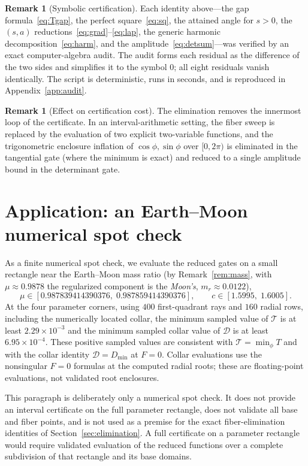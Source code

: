 \documentclass[11pt,reqno]{amsart}
\theoremstyle{plain}
\theoremstyle{definition}
\newtheorem{remark}[theorem]{Remark}
\newcommand{\calT}{\mathcal{T}}
\newcommand{\calD}{\mathcal{D}}
\begin{document}
\begin{remark}[Symbolic certification]\label{rem:audit}
Each identity above---the gap formula~\eqref{eq:Tgap}, the perfect square~\eqref{eq:sq}, the attained angle for $s>0$, the $(s,a)$ reductions~\eqref{eq:grad}--\eqref{eq:lap}, the generic harmonic decomposition~\eqref{eq:harm}, and the amplitude~\eqref{eq:detsum}---was verified by an exact computer-algebra audit. The audit forms each residual as the difference of the two sides and simplifies it to the symbol $0$; all eight residuals vanish identically. The script is deterministic, runs in seconds, and is reproduced in Appendix~\ref{app:audit}.
\end{remark}

\begin{remark}[Effect on certification cost]
The elimination removes the innermost loop of the certificate. In an interval-arithmetic setting, the fiber sweep is replaced by the evaluation of two explicit two-variable functions, and the trigonometric enclosure inflation of $\cos\phi,\sin\phi$ over $[0,2\pi)$ is eliminated in the tangential gate (where the minimum is exact) and reduced to a single amplitude bound in the determinant gate.
\end{remark}

\section{Application: an Earth--Moon numerical spot check}\label{sec:earthmoon}

As a finite numerical spot check, we evaluate the reduced gates on a small rectangle near the Earth--Moon mass ratio (by Remark~\ref{rem:mass}, with $\mu\approx0.9878$ the regularized component is the \emph{Moon's}, $m_r\approx 0.0122$),
\[
\mu\in[0.987839414390376,\;0.987859414390376],\qquad c\in[1.5995,\;1.6005].
\]
At the four parameter corners, using $400$ first-quadrant rays and $160$ radial rows, including the numerically located collar, the minimum sampled value of $\calT$ is at least $2.29\times10^{-3}$ and the minimum sampled collar value of $\calD$ is at least $6.95\times10^{-4}$. These positive sampled values are consistent with $\calT=\min_\phi T$ and with the collar identity $\calD=D_{\min}$ at $F=0$. Collar evaluations use the nonsingular $F=0$ formulas at the computed radial roots; these are floating-point evaluations, not validated root enclosures.

This paragraph is deliberately only a numerical spot check. It does not provide an interval certificate on the full parameter rectangle, does not validate all base and fiber points, and is not used as a premise for the exact fiber-elimination identities of Section~\ref{sec:elimination}. A full certificate on a parameter rectangle would require validated evaluation of the reduced functions over a complete subdivision of that rectangle and its base domains.
\end{document}

